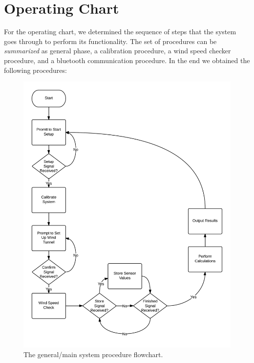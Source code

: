 \section{Operating Chart}
	For the operating chart, we determined the sequence of steps that the system goes through to perform its functionality. 
	The set of procedures can be \emph{summarized} as general phase, a calibration procedure, a wind speed checker procedure, and a bluetooth communication procedure. In the end we obtained the following procedures:

	\begin{figure}[H]
		\centering
			\includegraphics[scale=0.20]{img/flowchart-outline}
		\caption{The general/main system procedure flowchart.}
	\end{figure}
